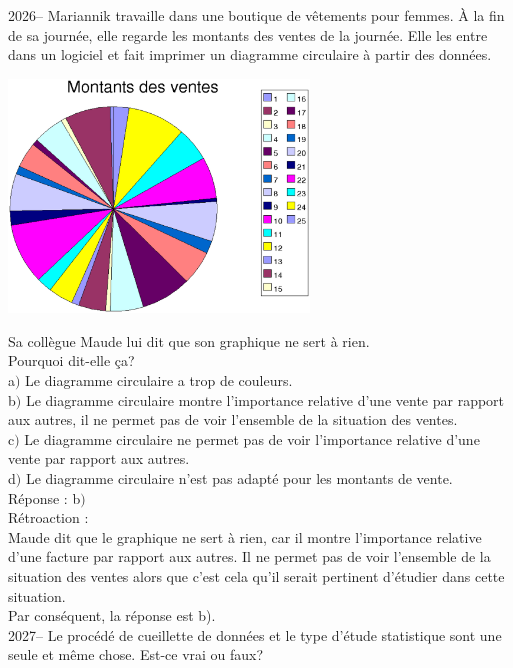\documentclass[letterpaper, 12pt]{article}
\begin{document}
2026-- Mariannik travaille dans une boutique de v\^etements pour femmes. \`A la fin de sa journ\'ee, elle regarde les montants des ventes de la journ\'ee. Elle les entre dans un logiciel et fait imprimer un diagramme circulaire \`a partir des donn\'ees.
\begin{center}
 \includegraphics[width=8cm]{Q2058b.eps}
\end{center}
Sa coll\`egue Maude lui dit que son graphique ne sert \`a rien.\\
Pourquoi dit-elle \c ca?\\

a$)$ Le diagramme circulaire a trop de couleurs.\\
b$)$ Le diagramme circulaire montre l'importance relative d'une vente par rapport aux autres, il ne permet pas de voir l'ensemble de la situation des ventes.\\
c$)$ Le diagramme circulaire ne permet pas de voir l'importance relative d'une vente par rapport aux autres.\\
d$)$ Le diagramme circulaire n'est pas adapt\'e pour les montants de vente.\\

R\'eponse : b$)$\\

R\'etroaction :\\
Maude dit que le graphique ne sert \`a rien, car il montre l'importance relative d'une facture par rapport aux autres. Il ne permet pas de voir l'ensemble de la situation des ventes alors que c'est cela qu'il serait pertinent d'\'etudier dans cette situation.\\
Par cons\'equent, la r\'eponse est b).\\

2027-- Le proc\'ed\'e de cueillette de donn\'ees et le type d'\'etude statistique sont une seule et m\^eme chose. Est-ce vrai ou faux?\\
\end{document}
